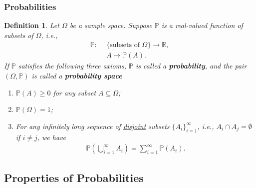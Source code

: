 \documentclass[11pt,letterpaper, leqno]{article}
\newtheorem{definition}{Definition}
\numberwithin{equation}{section}
\numberwithin{theorem}{section}
\numberwithin{lemma}{section}
\numberwithin{corollary}{section}
\numberwithin{definition}{section}
\numberwithin{proposition}{section}
\numberwithin{remark}{section}
\numberwithin{example}{section}
\begin{document}
\subsubsection{Probabilities}

\begin{definition}\label{def: probability space axioms}
Let $\Omega$ be a sample space. Suppose $\mathbb{P}$ is a real-valued function of subsets of $\Omega$, i.e.,
\begin{align*}
    \mathbb{P}:\ \ & \{\mbox{subsets of }\Omega\} \rightarrow \mathbb{R},\\ 
    & A \mapsto \mathbb{P}(A).
\end{align*}
If $\mathbb{P}$ satisfies the following three axioms, $\mathbb{P}$ is called a \textbf{probability}, and the pair $(\Omega,\mathbb{P})$ is called a \textbf{probability space}
\begin{enumerate}
    \item $\mathbb{P}(A)\ge0$ for any subset $A \subseteq \Omega$;
    
    \item $\mathbb{P}(\Omega)=1$;
    
    \item For any infinitely long sequence of \href{https://en.wikipedia.org/wiki/Mutual_exclusivity}{disjoint} subsets $\{A_i\}_{i=1}^\infty$, i.e., $A_i\cap A_j =\emptyset$ if $i\ne j$, we have 
    \begin{align*}
        \mathbb{P}\left(\bigcup_{i=1}^\infty A_i \right)=\sum_{i=1}^\infty \mathbb{P}(A_i).
    \end{align*}
\end{enumerate}
\end{definition}


\subsection{Properties of Probabilities}
\end{document}
